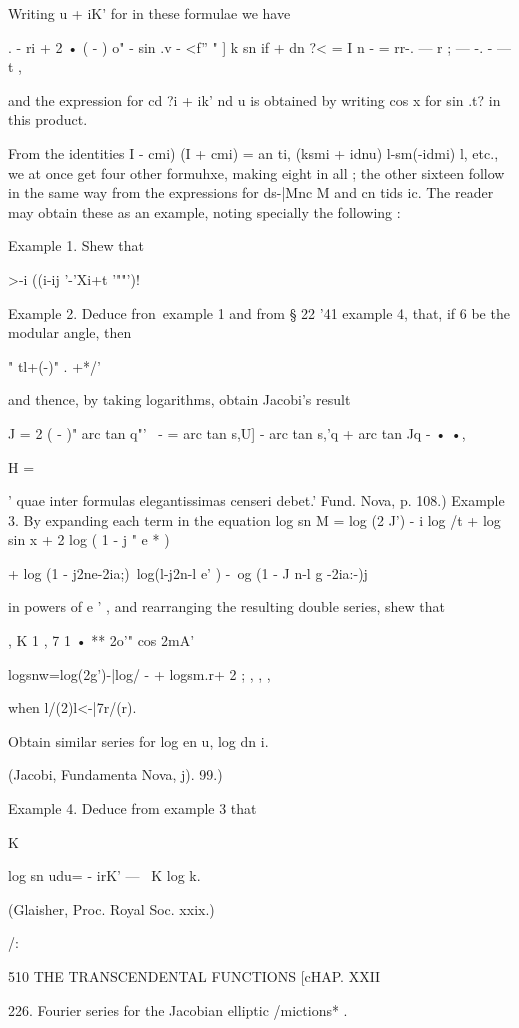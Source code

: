 Writing u + iK' for in these formulae we have

. - ri + 2 • ( - ) o" - sin .v - <f'' " ] k sn if + dn ?< = I n - =
rr-. — r ; — -. - — t ,

and the expression for cd ?i + ik' nd u is obtained by writing cos x
for sin .t? in this product.

From the identities I - cmi) (I + cmi) = an ti, (ksmi + idnu)
l-sm(-idmi) l, etc., we at once get four other formuhxe, making eight
in all ; the other sixteen follow in the same way from the expressions
for ds-|Mnc M and cn tids ic. The reader may obtain these as an
example, noting specially the following :

Example 1. Shew that

  >-i ((i-ij '-'Xi+t '""')!

Example 2. Deduce fron\ example 1 and from § 22 '41 example 4, that,
if 6 be the modular angle, then

" tl+(-)" . +*/'

and thence, by taking logarithms, obtain Jacobi's result

J = 2 ( - )" arc tan q"'~ - = arc tan s,U] - arc tan s,'q + arc tan Jq
- • •,

H =

' quae inter formulas elegantissimas censeri debet.' Fund. Nova, p.
108.) Example 3. By expanding each term in the equation log sn M = log
(2 J') - i log /t + log sin x + 2 log ( 1 - j " e * )

+ log (1 - j2ne-2ia;)\ log(l-j2n-l e' ) -\ og (1 - J n-l g -2ia:-)j

in powers of e ' , and rearranging the resulting double series, shew
that

, K 1 , 7 1 • ** 2o'" cos 2mA'

logsnw=log(2g')-|log/ - + logsm.r+ 2 ; , , ,

when l/(2)l<-|7r/(r).

Obtain similar series for log en u, log dn i.

(Jacobi, Fundamenta Nova, j). 99.)

Example 4. Deduce from example 3 that

 K

log sn udu= - irK' — \ K log k.

(Glaisher, Proc. Royal Soc. xxix.)

/:

510 THE TRANSCENDENTAL FUNCTIONS [cHAP. XXII

226. Fourier series for the Jacobian elliptic /mictions* .

